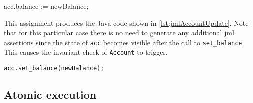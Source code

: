 \begin{vdmsl}[style=customVdm,caption={Updating the \texttt{Account}
balance in \ac{vdmsl}.},label={lst:vdmAccountUpdate},numbers=none]
acc.balance := newBalance;
\end{vdmsl}

\noindent This assignment produces the Java code shown in
\autoref{lst:jmlAccountUpdate}. Note that for this particular case
there is no need to generate any additional \ac{jml} assertions since
the state of \texttt{acc} becomes visible after the call to
\texttt{set\_balance}. This causes the invariant check of
\texttt{Account} to trigger.

\begin{lstlisting}[style=customJml,caption={Updating the
\texttt{Account} balance in the generated
code.},label={lst:jmlAccountUpdate},numbers=none]
acc.set_balance(newBalance);
\end{lstlisting}




\subsection{Atomic execution}
\label{sec:atomic}

